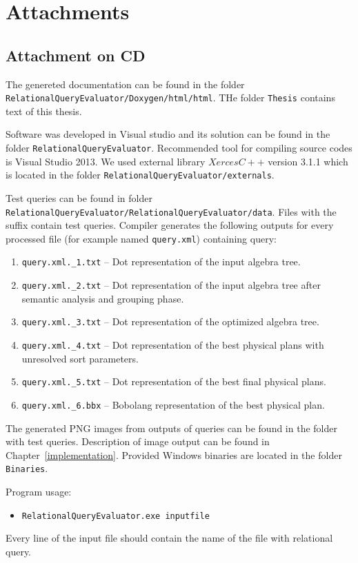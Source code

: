 \documentclass[12pt,a4paper]{report}
\let\openright=\clearpage
\def\chapwithtoc#1{
\chapter*{#1}
\addcontentsline{toc}{chapter}{#1}
}
\begin{document}
\openright
\pagestyle{plain}
\setcounter{page}{1}
\tableofcontents








% 






\chapwithtoc{Attachments}

\section*{Attachment on CD}
The genereted documentation can be found in the folder \texttt{Relational\-Query\-Eva\-lua\-tor/\-Doxygen/\-html/\-html}. THe folder \texttt{Thesis} contains text of this thesis.

Software was developed in Visual studio and its solution can be found in the folder \texttt{Relational\-Query\-Evaluator}. Recommended tool for compiling source codes is Visual Studio 2013. We used external library $Xerces C++$ version 3.1.1 which is located in the folder \texttt{Relational\-Query\-Evaluator/\-externals}. 

Test queries can be found in folder \texttt{Relational\-Query\-Evaluator/\-Relational\-Query\-Evaluator/\-data}. Files with the suffix  contain test queries. Compiler generates the following outputs for every processed file (for example named \texttt{query.xml}) containing query:   
\begin{enumerate}
\item \texttt{query.xml.\_1.txt} -- Dot representation of the input algebra tree.
\item \texttt{query.xml.\_2.txt} --  Dot representation of the input algebra tree after semantic analysis and grouping phase.
\item \texttt{query.xml.\_3.txt} -- Dot representation of the optimized algebra tree.
\item \texttt{query.xml.\_4.txt} -- Dot representation of the best physical plans with unresolved sort parameters.
\item \texttt{query.xml.\_5.txt} -- Dot representation of the best final physical plans.
\item \texttt{query.xml.\_6.bbx} -- Bobolang representation of the best physical plan.
\end{enumerate}
The generated PNG images from outputs of queries can be found in the folder with test queries. Description of image output can be found in Chapter~\ref{implementation}.
Provided Windows binaries are located in the folder \texttt{Binaries}.

Program usage: 
\begin{itemize}
\item \texttt{RelationalQueryEvaluator.exe inputfile}
\end{itemize}
 Every line of the input file should contain the name of the file with relational query.




\openright
\end{document}
